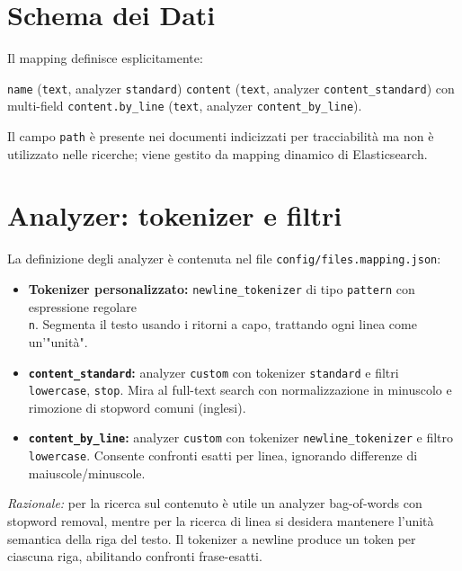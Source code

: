 \documentclass[a4paper,11pt]{article}
\begin{document}
\section{Schema dei Dati}
Il mapping definisce esplicitamente:\par
\vspace{0.2em}
\noindent\texttt{name} (\texttt{text}, analyzer \texttt{standard})\;\;\;\;\;
\texttt{content} (\texttt{text}, analyzer \texttt{content\_standard}) con multi-field \texttt{content.by\_line} (\texttt{text}, analyzer \texttt{content\_by\_line}).\par
\smallskip
Il campo \texttt{path} è presente nei documenti indicizzati per tracciabilità ma non è utilizzato nelle ricerche; viene gestito da mapping dinamico di Elasticsearch.

\section{Analyzer: tokenizer e filtri}
La definizione degli analyzer è contenuta nel file \texttt{config/files.mapping.json}:
\begin{itemize}[nosep]
  \item \textbf{Tokenizer personalizzato:} \texttt{newline\_tokenizer} di tipo \texttt{pattern} con espressione regolare \texttt{\\n}. Segmenta il testo usando i ritorni a capo, trattando ogni linea come un'"unità".
  \item \textbf{\texttt{content\_standard}:} analyzer \texttt{custom} con tokenizer \texttt{standard} e filtri \texttt{lowercase}, \texttt{stop}. Mira al full-text search con normalizzazione in minuscolo e rimozione di stopword comuni (inglesi).
  \item \textbf{\texttt{content\_by\_line}:} analyzer \texttt{custom} con tokenizer \texttt{newline\_tokenizer} e filtro \texttt{lowercase}. Consente confronti esatti per linea, ignorando differenze di maiuscole/minuscole.
\end{itemize}
\noindent\textit{Razionale:} per la ricerca sul contenuto è utile un analyzer bag-of-words con stopword removal, mentre per la ricerca di linea si desidera mantenere l'unità semantica della riga del testo. Il tokenizer a newline produce un token per ciascuna riga, abilitando confronti frase-esatti.
\end{document}
